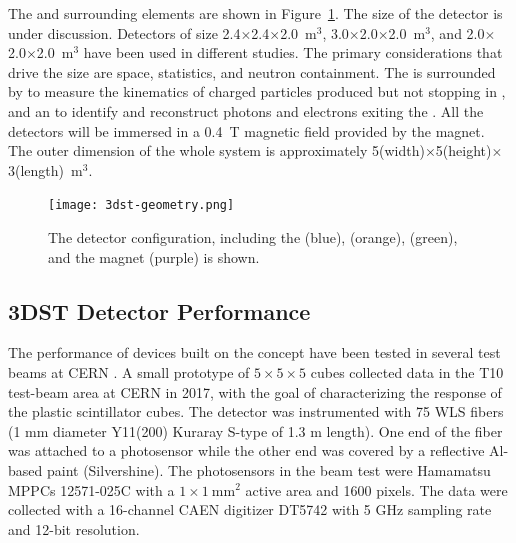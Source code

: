 The  and surrounding elements are shown in Figure~\ref{fig:3dst-geometry}.  The size of the  detector is under discussion.  Detectors of size 2.4$\times$2.4$\times$2.0~m$^{3}$, 3.0$\times$2.0$\times$2.0~m$^{3}$, and 2.0$\times$2.0$\times$2.0~m$^{3}$ have been used in different studies.  The primary considerations that drive the size are space, statistics, and neutron containment.
The  is surrounded by  to measure the kinematics of charged particles produced but not stopping in , and an  to identify and reconstruct photons and electrons exiting the . All the detectors will be immersed in a 0.4~T magnetic field provided by the magnet. The outer dimension of the whole system is approximately 5(width)$\times$5(height)$\times$3(length)~m$^3$. 


\begin{figure}
\begin{center}
  \texttt{[image: 3dst-geometry.png]}
\caption{\label{fig:3dst-geometry}
The  detector configuration, including the  (blue),  (orange),  (green), and the magnet (purple) is shown.} 
\end{center}
\end{figure}



\subsection{3DST Detector Performance}

The performance of devices built on the  concept have been tested in several test beams at CERN \cite{Mineev:2018ekk}.
A small prototype of $5\times5\times5$ cubes collected data in the T10 test-beam area at CERN in 2017, with the goal of characterizing the response of the plastic scintillator cubes.
The detector was instrumented with 75 WLS fibers (1 mm diameter Y11(200) Kuraray S-type of 1.3 m length). One end of the fiber was attached to a photosensor while the other end was covered by a reflective Al-based paint (Silvershine). The photosensors in the beam test were Hamamatsu MPPCs 12571-025C with a $1\times1~\text{mm}^2$ active area and 1600 pixels. The data were collected with a 16-channel CAEN digitizer DT5742 with 5 GHz sampling rate and 12-bit resolution.

